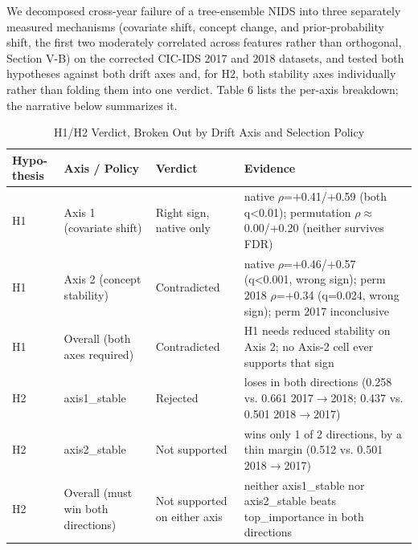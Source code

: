 \documentclass[conference]{IEEEtran}
\begin{document}
We decomposed cross-year failure of a tree-ensemble NIDS into three separately measured mechanisms (covariate shift, concept change, and prior-probability shift, the first two moderately correlated across features rather than orthogonal, Section V-B) on the corrected CIC-IDS 2017 and 2018 datasets, and tested both hypotheses against both drift axes and, for H2, both stability axes individually rather than folding them into one verdict. Table 6 lists the per-axis breakdown; the narrative below summarizes it.
\par\medskip

\begin{table}[t]
\centering
\caption{H1/H2 Verdict, Broken Out by Drift Axis and Selection Policy}
\label{tab:6}
\footnotesize
\setlength{\tabcolsep}{3pt}
\begin{tabularx}{\columnwidth}{>{\centering\arraybackslash}p{}>{\centering\arraybackslash}p{}>{\centering\arraybackslash}p{}>{\raggedright\arraybackslash}X}
\toprule
\textbf{Hypo-}\newline\textbf{thesis} & \textbf{Axis / Policy} & \textbf{Verdict} & \textbf{Evidence} \\
\midrule
H1 & Axis 1 (covariate shift) & Right sign, native only & native $\rho$=+0.41/+0.59 (both q<0.01); permutation $\rho$$\approx$0.00/+0.20 (neither survives FDR) \\
H1 & Axis 2 (concept stability) & Contradicted & native $\rho$=+0.46/+0.57 (q<0.001, wrong sign); perm 2018 $\rho$=+0.34 (q=0.024, wrong sign); perm 2017 inconclusive \\
H1 & Overall (both axes required) & Contradicted & H1 needs reduced stability on Axis 2; no Axis-2 cell ever supports that sign \\
H2 & axis1\_\allowbreak{}stable & Rejected & loses in both directions (0.258 vs. 0.661 2017$\rightarrow$2018; 0.437 vs. 0.501 2018$\rightarrow$2017) \\
H2 & axis2\_\allowbreak{}stable & Not supported & wins only 1 of 2 directions, by a thin margin (0.512 vs. 0.501 2018$\rightarrow$2017) \\
H2 & Overall (must win both directions) & Not supported on either axis & neither axis1\_\allowbreak{}stable nor axis2\_\allowbreak{}stable beats top\_\allowbreak{}importance in both directions \\
\bottomrule
\end{tabularx}
\end{table}
\end{document}
